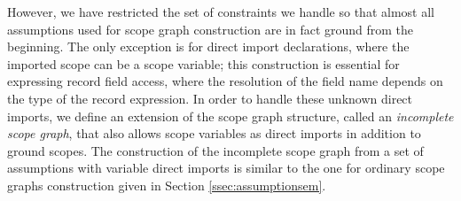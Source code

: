 However, we have restricted the set of constraints we handle so that almost all assumptions used for scope graph construction are 
in fact ground from the beginning.  The only exception is for direct import declarations, where
the imported scope can be a scope variable; this construction is essential for expressing record field access, where the
resolution of the field name depends on the type of the record expression.
%
%
%
In order to handle these unknown direct imports,
we define an extension of the scope graph structure, called an \emph{incomplete scope graph}, that also allows scope variables as direct imports in addition to ground scopes. The construction of the incomplete scope graph from a set of assumptions with variable direct imports is similar to the one for ordinary scope graphs construction given in Section \ref{ssec:assumptionsem}. 

